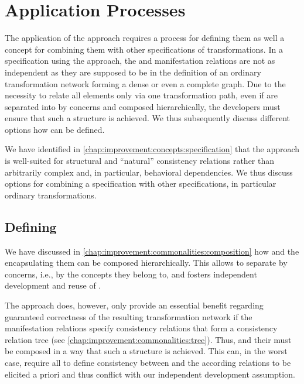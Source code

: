 \section{Application Processes}
\label{chap:improvement:application}

The application of the \commonalities approach requires a process for defining them as well a concept for combining them with other specifications of transformations.
In a specification using the \commonalities approach, the \conceptmetamodels and manifestation relations are not as independent as they are supposed to be in the definition of an ordinary transformation network forming a dense or even a complete graph.
Due to the necessity to relate all elements only via one transformation path, even if \commonalities are separated into \conceptmetamodels by concerns and composed hierarchically, the developers must ensure that such a structure is achieved.
We thus subsequently discuss different options how \commonalities can be defined.

We have identified in \autoref{chap:improvement:concepts:specification} that the \commonalities approach is well-suited for structural and \enquote{natural} consistency relations rather than arbitrarily complex and, in particular, behavioral dependencies.
We thus discuss options for combining a \commonalities specification with other specifications, in particular ordinary transformations.


\subsection{Defining \Commonalities}

We have discussed in \autoref{chap:improvement:commonalities:composition} how \commonalities and the \conceptmetamodels encapsulating them can be composed hierarchically.
This allows to separate \commonalities by concerns, i.e., by the concepts they belong to, and fosters independent development and reuse of \conceptmetamodels.

The \commonalities approach does, however, only provide an essential benefit regarding guaranteed correctness of the resulting transformation network if the manifestation relations specify consistency relations that form a consistency relation tree (see \autoref{chap:improvement:commonalities:tree}).
Thus, \commonalities and their \conceptmetamodels must be composed in a way that such a structure is achieved.
This can, in the worst case, require all \concretemetamodels to define consistency between and the according relations to be elicited a priori and thus conflict with our independent development assumption.


